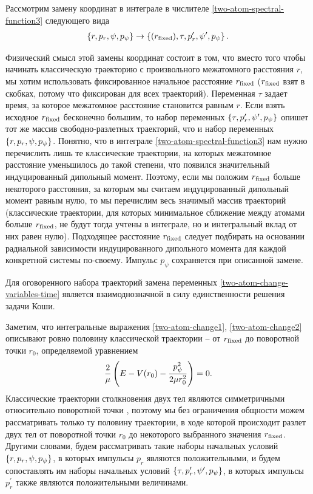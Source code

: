 Рассмотрим замену координат в интеграле в числителе \eqref{two-atom-spectral-function3} следующего вида
\begin{gather}
    \left\{ r, p_r, \psi, p_\psi \right\} \rightarrow \left\{ (r_\text{fixed}), \tau, p_r^\prime, \psi^\prime, p_\psi \right\} \label{two-atom-change-variables-time}.
\end{gather}

Физический смысл этой замены координат состоит в том, что вместо того чтобы начинать классическую траекторию с произвольного межатомного расстояния $r$, мы хотим использовать фиксированное начальное расстояние $r_\text{fixed}$ ($r_\text{fixed}$ взят в скобках, потому что фиксирован для всех траекторий). Переменная $\tau$ задает время, за которое межатомное расстояние становится равным $r$. Если взять исходное $r_\text{fixed}$ бесконечно большим, то набор переменных $\left\{ \tau, p_r^\prime, \psi^\prime, p_\psi \right\}$ опишет тот же массив свободно-разлетных траекторий, что и набор переменных $\left\{ r, p_r, \psi, p_\psi \right\}$. Понятно, что в интеграле \eqref{two-atom-spectral-function3} нам нужно перечислить лишь те классические траектории, на которых межатомное расстояние уменьшилось до такой степени, что появился значительный индуцированный дипольный момент. Поэтому, если мы положим $r_\text{fixed}$ больше некоторого расстояния, за которым мы считаем индуцированный дипольный момент равным нулю, то мы перечислим весь значимый массив траекторий (классические траектории, для которых минимальное сближение между атомами больше $r_\text{fixed}$, не будут тогда учтены в интеграле, но и интегральный вклад от них равен нулю). Подходящее расстояние $r_\text{fixed}$ следует подбирать на основании радиальной зависимости индуцированного дипольного момента для каждой конкретной системы по-своему. Импульс $p_\psi$ сохраняется при описанной замене. \par
Для оговоренного набора траекторий замена переменных \eqref{two-atom-change-variables-time} является взаимоднозначной в силу единственности решения задачи Коши. \par
Заметим, что интегральные выражения \eqref{two-atom-change1}, \eqref{two-atom-change2} описывают ровно половину классической траектории -- от $r_\text{fixed}$ до поворотной точки $r_0$, определяемой уравнением
\begin{gather}
    \frac{2}{\mu} \left( E - V(r_0) - \frac{p_\psi^2}{2 \mu r_0^2} \right) = 0.
\end{gather}
Классические траектории столкновения двух тел являются симметричными относительно поворотной точки \cite{goldstein}, поэтому мы без ограничения общности можем рассматривать только ту половину траектории, в ходе которой происходит разлет двух тел от поворотной точки $r_0$ до некоторого выбранного значения $r_\text{fixed}$. Другими словами, будем рассматривать такие наборы начальных условий $\left\{ r, p_r, \psi, p_\psi \right\}$,  в которых импульсы $p_r$ являются положительными, и будем сопоставлять им наборы начальных условий $\left\{ \tau, p_r^\prime, \psi^\prime, p_\psi \right\}$, в которых импульсы $p_r^\prime$ также являются положительными величинами. \par
